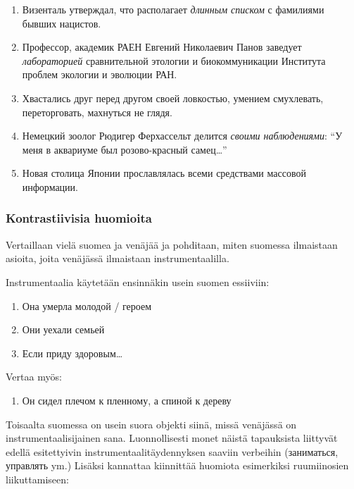 \documentclass[]{scrartcl}
\providecommand{\tightlist}{%
  \setlength{\itemsep}{0pt}\setlength{\parskip}{0pt}}
\begin{document}
\begin{enumerate}
\def\labelenumi{(\arabic{enumi})}
\setcounter{enumi}{148}
\tightlist
\item
  Визенталь утверждал, что располагает \emph{длинным списком} с
  фамилиями бывших нацистов.
\item
  Профессор, академик РАЕН Евгений Николаевич Панов заведует
  \emph{лабораторией} сравнительной этологии и биокоммуникации Института
  проблем экологии и эволюции РАН.
\item
  Хвастались друг перед другом своей ловкостью, умением смухлевать,
  переторговать, махнуться не глядя.
\item
  Немецкий зоолог Рюдигер Ферхассельт делится \emph{своими
  наблюдениями}: ``У меня в аквариуме был розово-красный самец\ldots{}''
\item
  Новая столица Японии прославлялась всеми средствами массовой
  информации.
\end{enumerate}

\subsubsection{Kontrastiivisia
huomioita}\label{kontrastiivisia-huomioita}

Vertaillaan vielä suomea ja venäjää ja pohditaan, miten suomessa
ilmaistaan asioita, joita venäjässä ilmaistaan instrumentaalilla.

Instrumentaalia käytetään ensinnäkin usein suomen essiiviin:

\begin{enumerate}
\def\labelenumi{(\arabic{enumi})}
\setcounter{enumi}{153}
\tightlist
\item
  Она умерла молодой / героем
\item
  Они уехали семьей
\item
  Если приду здоровым\ldots{}
\end{enumerate}

Vertaa myös:

\begin{enumerate}
\def\labelenumi{(\arabic{enumi})}
\setcounter{enumi}{156}
\tightlist
\item
  Он сидел плечом к пленному, а спиной к дереву
\end{enumerate}

Toisaalta suomessa on usein suora objekti siinä, missä venäjässä on
instrumentaalisijainen sana. Luonnollisesti monet näistä tapauksista
liittyvät edellä esitettyivin instrumentaalitäydennyksen saaviin
verbeihin (заниматься, управлять ym.) Lisäksi kannattaa kiinnittää
huomiota esimerkiksi ruumiinosien liikuttamiseen:
\end{document}
